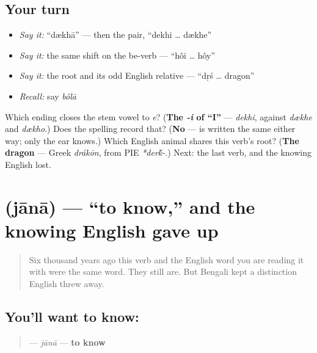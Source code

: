 \subsection*{Your turn}
\begin{itemize}
\raggedright
  \item \emph{Say it:} \textquotedblleft{}dækhā\textquotedblright{} — then the pair, \textquotedblleft{}dekhi … dækhe\textquotedblright{}
  \item \emph{Say it:} the same shift on the be-verb — \textquotedblleft{}hôi … hôy\textquotedblright{}
  \item \emph{Say it:} the root and its odd English relative — \textquotedblleft{}dṛś … dragon\textquotedblright{}
  \item \emph{Recall:} say \emph{bôlā}
\end{itemize}

\begin{tcolorbox}[breakable,colback=teal!4,colframe=teal!35!black,title={Before you move on}]
Which ending closes the stem vowel to \emph{e}? (\textbf{The \emph{-i} of \textquotedblleft{}I\textquotedblright{}} — \emph{dekhi}, against \emph{dækhe} and \emph{dækho}.) Does the spelling record that? (\textbf{No} —  is written the same either way; only the ear knows.) Which English animal shares this verb's root? (\textbf{The dragon} — Greek \emph{drákōn}, from PIE \emph{*der\'{k}-}.) Next: the last verb, and the knowing English lost.
\end{tcolorbox}
\section[\texorpdfstring{\bn{জানা} (jānā)}{জানা (jānā)}]{ (jānā) — \textquotedblleft{}to know,\textquotedblright{} and the knowing English gave up}

\label{lesson:BN-C07-jana}



\begin{quote}
Six thousand years ago this verb and the English word you are reading it with were the same word. They still are. But Bengali kept a distinction English threw away.
\end{quote}

\subsection*{You'll want to know: }
\begin{quote}
\textbf{} — \emph{jānā} — \textbf{to know}
\end{quote}

